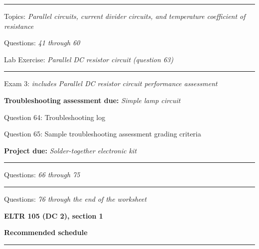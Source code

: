 

\vskip 10pt
\hrule \vskip 5pt
\noindent
{}

\hskip 10pt Topics: {\it Parallel circuits, current divider circuits, and temperature coefficient of resistance}
 
\hskip 10pt Questions: {\it 41 through 60}
 
\hskip 10pt Lab Exercise: {\it Parallel DC resistor circuit (question 63)}
 

\vskip 10pt
\hrule \vskip 5pt
\noindent
{}

\hskip 10pt Exam 3: {\it includes Parallel DC resistor circuit performance assessment}
 
\hskip 10pt {\bf Troubleshooting assessment due:} {\it Simple lamp circuit}
 
\hskip 10pt Question 64: Troubleshooting log
 
\hskip 10pt Question 65: Sample troubleshooting assessment grading criteria
 
\hskip 10pt {\bf Project due:} {\it Solder-together electronic kit}
 
\vskip 10pt
\hrule \vskip 5pt
\noindent
{}

\hskip 10pt Questions: {\it 66 through 75}
 
\vskip 10pt
\hrule \vskip 5pt
\noindent
{}

\hskip 10pt Questions: {\it 76 through the end of the worksheet}
 
\vskip 10pt





\vfil \eject

\centerline{\bf ELTR 105 (DC 2), section 1} \bigskip 
 
\vskip 10pt

\noindent
{\bf Recommended schedule}

\vskip 5pt

\hrule \vskip 5pt
\noindent
{}

